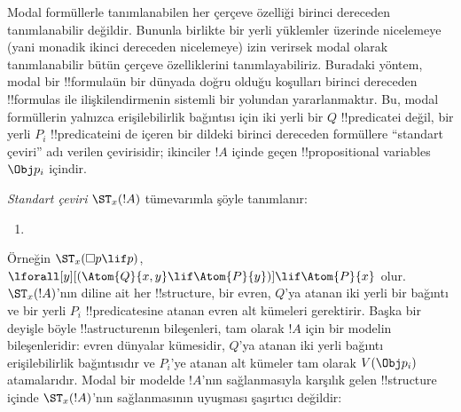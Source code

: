 



Modal formüllerle tanımlanabilen her çerçeve özelliği birinci dereceden
tanımlanabilir değildir. Bununla birlikte bir yerli yüklemler üzerinde
nicelemeye (yani monadik ikinci dereceden nicelemeye) izin verirsek modal
olarak tanımlanabilir bütün çerçeve özelliklerini tanımlayabiliriz. Buradaki
yöntem, modal bir !!{formula}{}ün bir dünyada doğru olduğu koşulları birinci
dereceden !!{formula}s ile ilişkilendirmenin sistemli bir yolundan
yararlanmaktır. Bu, modal formüllerin yalnızca erişilebilirlik bağıntısı için
iki yerli bir $Q$ !!{predicate}{}i değil, bir yerli $P_i$ !!{predicate}{}ini
de içeren bir dildeki birinci dereceden formüllere ``standart çeviri'' adı verilen çevirisidir;
ikinciler $!A$ içinde geçen !!{propositional variable}s $\Obj p_i$ içindir.

\begin{defn}
  \emph{Standart çeviri} $\ST_x(!A)$ tümevarımla şöyle tanımlanır:
  \begin{enumerate}
  \item {}
  \end{enumerate}
\end{defn}

Örneğin $\ST_x(\Box p\lif p)$, $\lforall[y][(\Atom{Q}{x,y}
  \lif \Atom{P}{y})]\lif\Atom{P}{x}$ olur. $\ST_x(!A)$'nın diline ait
her !!{structure}, bir evren, $Q$'ya atanan iki yerli bir bağıntı ve bir
yerli $P_i$ !!{predicate}s{}ine atanan evren alt kümeleri gerektirir. Başka
bir deyişle böyle !!a{structure}{}nın bileşenleri, tam olarak $!A$ için bir
modelin bileşenleridir: evren dünyalar kümesidir, $Q$'ya atanan iki yerli
bağıntı erişilebilirlik bağıntısıdır ve $P_i$'ye atanan alt kümeler tam
olarak $V(\Obj p_i)$ atamalarıdır. Modal bir modelde $!A$'nın sağlanmasıyla
karşılık gelen !!{structure} içinde $\ST_x(!A)$'nın sağlanmasının uyuşması
şaşırtıcı değildir:

